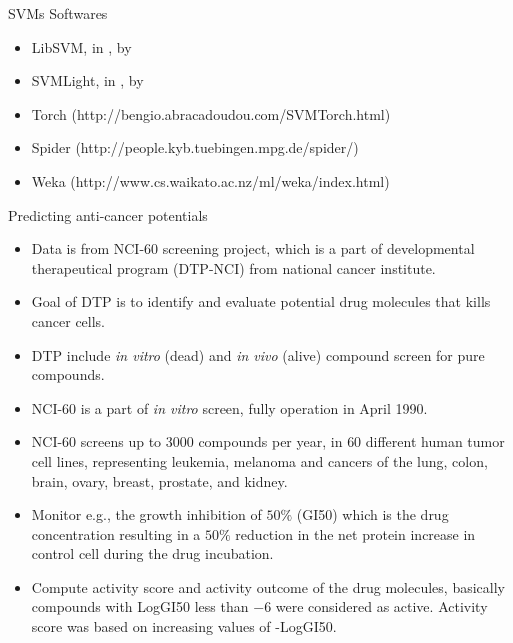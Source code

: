 \documentclass[first=dgreen,second=purple,logo=yellowexc]{aaltoslides}
\begin{document}
{\begin{frame}{SVMs Softwares}
	\begin{itemize}
		\item LibSVM, in \cpp, by \citet{Chang11libsvm}
		\item SVMLight, in \ccc, by \citet{Joachims98making}
		\item Torch (http://bengio.abracadoudou.com/SVMTorch.html)
		\item Spider (http://people.kyb.tuebingen.mpg.de/spider/)
		\item Weka (http://www.cs.waikato.ac.nz/ml/weka/index.html)
	\end{itemize}
\end{frame}

\begin{frame}{Predicting anti-cancer potentials}
	\begin{itemize}
		\item Data is from NCI-60 screening project, which is a part of developmental therapeutical program (DTP-NCI) from national cancer institute.
		\item Goal of DTP is to identify and evaluate potential drug molecules that kills cancer cells.
		\item DTP include \textit{in vitro} (dead) and \textit{in vivo} (alive) compound screen for pure compounds.
		\item NCI-60 is a part of \textit{in vitro} screen, fully operation in April 1990.
		\item NCI-60 screens up to $3000$ compounds per year, in $60$ different human tumor cell lines, representing leukemia, melanoma and cancers of the lung, colon, brain, ovary, breast, prostate, and kidney.
		\item Monitor e.g., the growth inhibition of $50\%$ (GI50)  which is the drug concentration resulting in a $50\%$ reduction in the net protein increase in control cell during the drug incubation.
		\item Compute activity score and activity outcome of the drug molecules, basically compounds with LogGI50 less than $-6$ were considered as active. Activity score was based on increasing values of -LogGI50.
	\end{itemize}
\end{frame}

}
\end{document}
